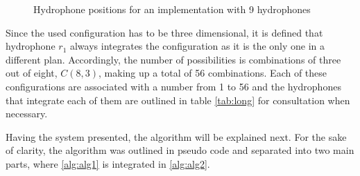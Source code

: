 \begin{figure}[!htbp]
	
	\captionsetup{justification=centering,margin=2cm}
	\caption{Hydrophone positions for an implementation with 9 hydrophones}
	\label{fig:9h-config}
\end{figure}

Since the used configuration has to be three dimensional, it is defined that hydrophone $r_1$ always integrates the configuration as it is the only one in a different plan. Accordingly, the number of possibilities is combinations of three out of eight, $C(8,3)$, making up a total of 56 combinations. Each of these configurations are associated with a number from 1 to 56 and the hydrophones that integrate each of them are outlined in table \ref{tab:long} for consultation when necessary.

Having the system presented, the algorithm will be explained next. For the sake of clarity, the algorithm was outlined in pseudo code and separated into two main parts, where \ref{alg:alg1} is integrated in \ref{alg:alg2}.

